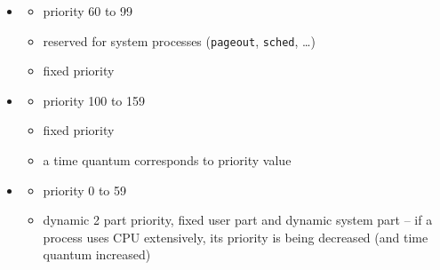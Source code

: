 \begin{slide}
\setlength{\baselineskip}{0.8\baselineskip}
\begin{itemize}
\item {}
    \begin{itemize}
    \item priority 60 to 99
    \item reserved for system processes (\texttt{pageout},
    \texttt{sched}, \dots)
    \item fixed priority
    \end{itemize}
\item {}
    \begin{itemize}
    \item priority 100 to 159
    \item fixed priority
    \item a time quantum corresponds to priority value
    \end{itemize}
\item {}
    \begin{itemize}
    \item priority 0 to 59
    \item dynamic 2 part priority, fixed user part and
    dynamic system part -- if a process uses CPU extensively,
    its priority is being decreased (and time quantum increased)
    \end{itemize}
\end{itemize}
\end{slide}

